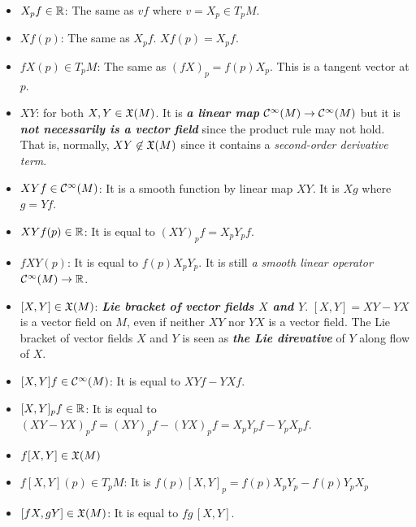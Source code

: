 \documentclass[11pt]{article}
\begin{document}
\begin{itemize}
\item $X_pf \in {\mathbb R}$: \quad The same as $vf$ where $v = X_p \in T_pM$.

\item $Xf(p)$: \quad The same as $X_pf$. $Xf(p) = X_pf$.

\item $fX(p) \in T_pM$: \quad The same as $(fX)_p = f(p)X_p$. This is a tangent vector at $p$.

\item $XY$: \quad for both $X, Y \in {\mathfrak X}(M)$. It is \emph{\textbf{a linear map}} ${\mathcal C}^{\infty}(M) \rightarrow {\mathcal C}^{\infty}(M)$ but it is \textbf{\emph{not necessarily is a vector field}} since the product rule may not hold. That is, normally,  $XY \not\in {\mathfrak X}(M)$ since it contains a \emph{second-order derivative term}.

\item $XYf \in {\mathcal C}^{\infty}(M)$: \quad It is a smooth function by linear map $XY$. It is $Xg$ where $g=Yf$.

\item $XYf(p) \in {\mathbb R}$: \quad It is equal to $(XY)_pf = X_pY_pf$.

\item $fXY(p)$: \quad It is equal to $f(p)X_pY_p$. It is still \emph{a smooth linear operator}  ${\mathcal C}^{\infty}(M) \rightarrow {\mathbb R}$.

\item $[X, Y] \in {\mathfrak X}(M)$: \quad \emph{\textbf{Lie bracket of vector fields $X$ and $Y$}}. $[X, Y] = XY - YX$ is a vector field on $M$, even if neither $XY$ nor $YX$ is a vector field. The Lie bracket of vector fields $X$ and $Y$ is seen as \emph{\textbf{the Lie direvative}} of $Y$ along flow of $X$.

\item $[X, Y]f \in {\mathcal C}^{\infty}(M)$: \quad It is equal to $XYf - YXf$.

\item $[X, Y]_{p}f \in {\mathbb R}$: \quad It is equal to $(XY-YX)_pf = (XY)_pf - (YX)_pf = X_pY_pf - Y_pX_pf$.

\item $f[X, Y] \in {\mathfrak X}(M)$

\item $f[X, Y](p) \in  T_pM$: \quad It is $f(p)[X, Y]_p = f(p)X_pY_p - f(p)Y_pX_p$

\item $[fX, gY] \in {\mathfrak X}(M)$: \quad It is equal to $fg\,[X, Y]$.
\end{itemize}
\end{document}
